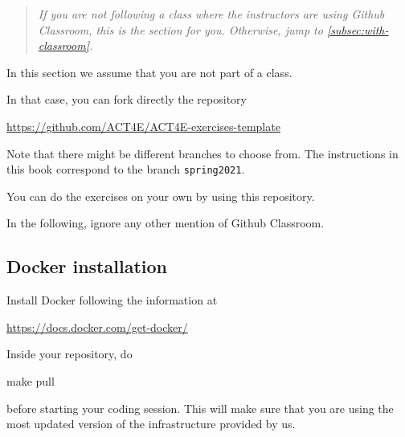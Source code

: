 \begin{quote}
  \emph{
    If you are \emph{not} following a class where the instructors are using Github Classroom,
    this is the section for you. Otherwise, jump to \cref{subsec:with-classroom}.
  }
\end{quote}

In this section we assume that you are not part of a class.

In that case, you can fork directly the repository

\url{https://github.com/ACT4E/ACT4E-exercises-template}

Note that there might be different branches to choose from. The instructions in this book correspond to
the branch \texttt{spring2021}.

You can do the exercises on your own by using this repository.

In the following, ignore any other mention of Github Classroom.

\subsection{Docker installation}

Install Docker following the information at

\url{https://docs.docker.com/get-docker/}

Inside your repository, do

\begin{console}
  make pull
\end{console}

before starting your coding session. This will make sure that you are using the most updated version of the infrastructure provided by us.



